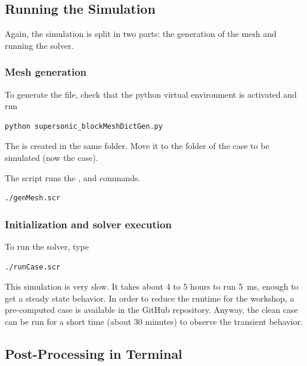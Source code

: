 \documentclass[
    parskip=half,      %
    DIV=12,            %
    headings=normal,   %
    fontsize=11pt,     %
    english            %
]{scrartcl}
\begin{document}
\subsection{Running the Simulation}

Again, the simulation is split in two parts: the generation of the mesh and running the solver.

\subsubsection{Mesh generation}

To generate the  file, check that the python virtual environment is activated and run
\begin{lstlisting}[style=terminal]
python supersonic_blockMeshDictGen.py
\end{lstlisting}
The  is created in the same folder. Move it to the  folder
of the case to be simulated (now the  case).

The  script runs the ,  and
 commands.

\begin{lstlisting}[style=terminal]
./genMesh.scr
\end{lstlisting}

\subsubsection{Initialization and solver execution}

To run the solver, type

\begin{lstlisting}[style=terminal]
./runCase.scr
\end{lstlisting}

This simulation is very slow. It takes about 4 to 5 hours to run \qty{5}{ms}, enough to get a
steady state behavior. In order to reduce the runtime for the workshop, a pre-computed case
is available in the GitHub repository. Anyway, the clean case can be run for a short time (about 
30 minutes) to observe the transient behavior.



\subsection{Post-Processing in Terminal}
\end{document}
